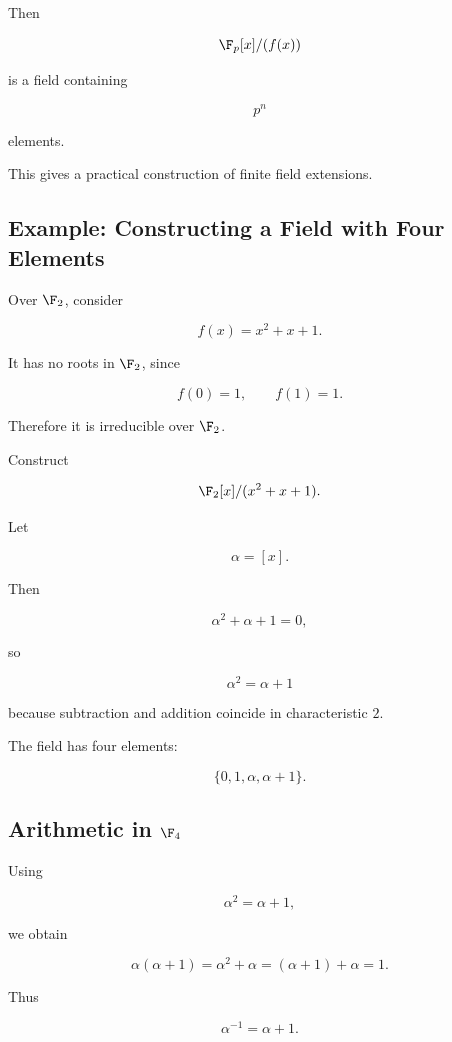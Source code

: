 Then

\[ \F_p[x]/(f(x)) \]

is a field containing

\[ p^n \]

elements.

This gives a practical construction of finite field extensions.

\subsection{Example: Constructing a Field with Four Elements}
\label{subsec:field-four-elements}

Over \(\F_2\), consider

\[ f(x)=x^2+x+1. \]

It has no roots in \(\F_2\), since

\[ f(0)=1,\qquad f(1)=1. \]

Therefore it is irreducible over \(\F_2\).

Construct

\[ \F_2[x]/(x^2+x+1). \]

Let

\[ \alpha=[x]. \]

Then

\[ \alpha^2+\alpha+1=0, \]

so

\[ \alpha^2=\alpha+1 \]

because subtraction and addition coincide in characteristic \(2\).

The field has four elements:

\[ \{0,1,\alpha,\alpha+1\}. \]

\subsection{Arithmetic in \(\F_4\)}
\label{subsec:arithmetic-f4}

Using

\[ \alpha^2=\alpha+1, \]

we obtain

\[ \alpha(\alpha+1)=\alpha^2+\alpha=(\alpha+1)+\alpha=1. \]

Thus

\[ \alpha^{-1}=\alpha+1. \]

